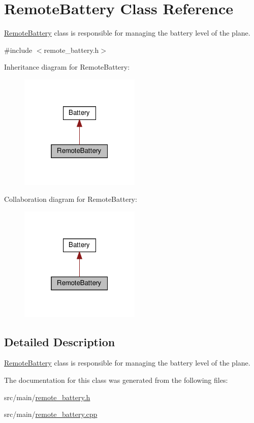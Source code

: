 \hypertarget{class_remote_battery}{}\section{Remote\+Battery Class Reference}
\label{class_remote_battery}


\hyperlink{class_remote_battery}{Remote\+Battery} class is responsible for managing the battery level of the plane.  




{\ttfamily \#include $<$remote\+\_\+battery.\+h$>$}



Inheritance diagram for Remote\+Battery\+:\nopagebreak
\begin{figure}[H]
\begin{center}
\leavevmode
\includegraphics[width=163pt]{class_remote_battery__inherit__graph}
\end{center}
\end{figure}


Collaboration diagram for Remote\+Battery\+:\nopagebreak
\begin{figure}[H]
\begin{center}
\leavevmode
\includegraphics[width=163pt]{class_remote_battery__coll__graph}
\end{center}
\end{figure}


\subsection{Detailed Description}
\hyperlink{class_remote_battery}{Remote\+Battery} class is responsible for managing the battery level of the plane. 

The documentation for this class was generated from the following files\+:\begin{DoxyCompactItemize}
\item 
src/main/\hyperlink{remote__battery_8h}{remote\+\_\+battery.\+h}\item 
src/main/\hyperlink{remote__battery_8cpp}{remote\+\_\+battery.\+cpp}\end{DoxyCompactItemize}
